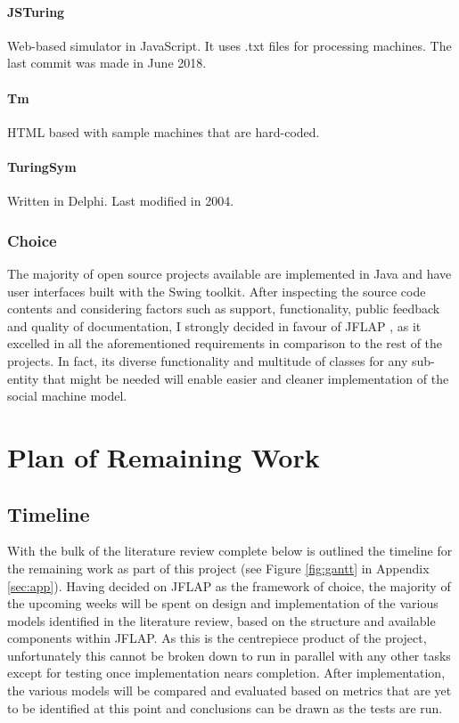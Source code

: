 \documentclass[12pt,a4,xcolor=table]{article}
\begin{document}
\begin{multicols}{4}
	\paragraph{JSTuring}
	Web-based simulator in JavaScript. It uses .txt files for processing machines. The last commit was made in June 2018.
	\paragraph{Tm}
	HTML based with sample machines that are hard-coded.
	
	\paragraph{TuringSym}
	Written in Delphi. Last modified in 2004.
	
	
\end{multicols}

\subsubsection{Choice}

The majority of open source projects available are implemented in Java and have user interfaces built with the Swing toolkit. After inspecting the source code contents and considering factors such as support, functionality, public feedback and quality of documentation, I strongly decided in favour of JFLAP \cite{rodger2006jflap}, as it excelled in all the aforementioned requirements in comparison to the rest of the projects. In fact, its diverse functionality and multitude of classes for any sub-entity that might be needed will enable easier and cleaner implementation of the social machine model.


\section{Plan of Remaining Work}

\subsection{Timeline}

With the bulk of the literature review complete below is outlined the timeline for the remaining work as part of this project (see Figure \ref{fig:gantt} in Appendix \ref{sec:app}). Having decided on JFLAP as the framework of choice, the majority of the upcoming weeks will be spent on design and implementation of the various models identified in the literature review, based on the structure and available components within JFLAP. As this is the centrepiece product of the project, unfortunately this cannot be broken down to run in parallel with any other tasks except for testing once implementation nears completion. After implementation, the various models will be compared and evaluated based on metrics that are yet to be identified at this point and conclusions can be drawn as the tests are run.
\end{document}

